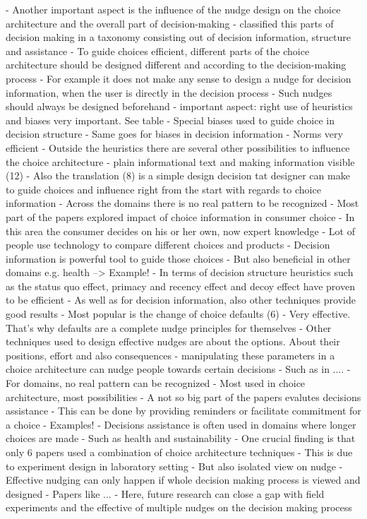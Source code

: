 - Another important aspect is the influence of the nudge design on the choice architecture and the overall part of decision-making
- \cite{munscher_review_2016} classified this parts of decision making in a taxonomy consisting out of decision information, structure and assistance
- To guide choices efficient, different parts of the choice architecture should be designed different and according to the decision-making process
- For example it does not make any sense to design a nudge for decision information, when the user is directly in the decision process
- Such nudges should always be designed beforehand
- important aspect: right use of heuristics and biases very important. See table
- Special biases used to guide choice in decision structure
- Same goes for biases in decision information
- Norms very efficient
- Outside the heuristics there are several other possibilities to influence the choice architecture
- plain informational text and making information visible (12)
- Also the translation (8) is a simple design decision tat designer can make to guide choices and influence right from the start with regards to choice information
-  Across the domains there is no real pattern to be recognized
- Most part of the papers explored impact of choice information in consumer choice
- In this area the consumer decides on his or her own, now expert knowledge
- Lot of people use technology to compare different choices and products
- Decision information is powerful tool to guide those choices
- But also beneficial in other domains e.g. health --> Example!
- In terms of decision structure heuristics such as the status quo effect, primacy and recency effect and decoy effect have proven to be efficient
- As well as for decision information, also other techniques provide good results
- Most popular is the change of choice defaults (6)
- Very effective. That's why defaults are a complete nudge principles for themselves
- Other techniques used to design effective nudges are about the options. About their positions, effort and also consequences
- manipulating these parameters in a choice architecture can nudge people towards certain decisions
- Such as in ....
- For domains, no real pattern can be recognized
- Most used in choice architecture, most possibilities
- A not so big part of the papers evalutes decisions assistance
- This can be done by providing reminders or facilitate commitment for a choice
- Examples!
- Decisions assistance is often used in domains where longer choices are made
- Such as health and sustainability
- One crucial finding is that only 6 papers used a combination of choice architecture techniques
- This is due to experiment design in laboratory setting
- But also isolated view on nudge
- Effective nudging can only happen if whole decision making process is viewed and designed
- Papers like ... 
- Here, future research can close a gap with field experiments and the effective of multiple nudges on the decision making process